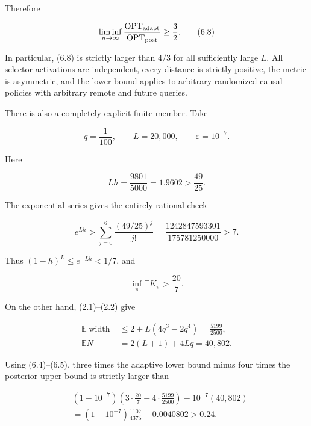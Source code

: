 \documentclass[11pt,a4paper]{article}
\begin{document}
Therefore


\begin{equation}
 \liminf_{n\to\infty}
 \frac{\operatorname{OPT}_{\rm adapt}}
      {\operatorname{OPT}_{\rm post}}
 \ge\frac32.
\tag{6.8}
\end{equation}

In particular, (6.8) is strictly larger than \(4/3\) for all sufficiently large \(L\).  All selector activations are independent, every distance is strictly positive, the metric is asymmetric, and the lower bound applies to arbitrary randomized causal policies with arbitrary remote and future queries.


There is also a completely explicit finite member.  Take


\begin{equation}
       q=\frac1{100},\qquad L=20{,}000,\qquad
       \varepsilon=10^{-7}.
\tag{6.9}
\end{equation}

Here


\[
 Lh=\frac{9801}{5000}=1.9602>\frac{49}{25}.
\]

The exponential series gives the entirely rational check


\begin{equation}
 e^{Lh}>
 \sum_{j=0}^{6}\frac{(49/25)^j}{j!}
 =\frac{1242847593301}{175781250000}>7.
\tag{6.10}
\end{equation}

Thus \((1-h)^L\le e^{-Lh}<1/7\), and


\begin{equation}
                 \inf_\pi\mathbb E K_\pi>\frac{20}{7}.
\tag{6.11}
\end{equation}

On the other hand, (2.1)--(2.2) give


\begin{equation}
\begin{aligned}
\mathbb E\operatorname{width}
 &\le2+L(4q^3-2q^4)
   =\frac{5199}{2500},\\
\mathbb EN
 &=2(L+1)+4Lq
   =40{,}802.
\end{aligned}
\tag{6.12}
\end{equation}

Using (6.4)--(6.5), three times the adaptive lower bound minus four times the posterior upper bound is strictly larger than


\begin{equation}
\begin{aligned}
 &(1-10^{-7})
 \left(3\cdot\frac{20}{7}
       -4\cdot\frac{5199}{2500}\right)
 -10^{-7}(40{,}802)\\
 &=(1-10^{-7})\frac{1107}{4375}-0.0040802
 >0.24.
\end{aligned}
\tag{6.13}
\end{equation}
\end{document}
